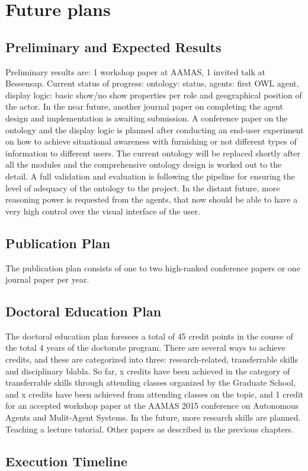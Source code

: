 \section{Future plans}
\subsection{Preliminary and Expected Results}

Preliminary results are: 1 workshop paper at AAMAS, 1 invited talk at Bessensap. 
Current status of progress: ontology: status, agents: first OWL agent, display logic: basic show/no show properties per role and geographical position of the actor. 
In the near future, another journal paper on completing the agent design and implementation is awaiting submission. A conference paper on the ontology and the display logic is planned after conducting an end-user experiment on how to achieve situational awareness with furnishing or not different types of information to different users. The current ontology will be replaced shortly after all the modules and the comprehensive ontology design is worked out to the detail. A full validation and evaluation is following the pipeline for ensuring the level of adequacy of the ontology to the project.
In the distant future, more reasoning power is requested from the agents, that now should be able to have a very high control over the visual interface of the user. 

\subsection{Publication Plan}

The publication plan consists of one to two high-ranked conference papers or one journal paper per year. 

\subsection{Doctoral Education Plan}
The doctoral education plan foresees a total of 45 credit points in the course of the total 4 years of the doctorate program. There are several ways to achieve credits, and these are categorized into three: research-related, transferrable skills and disciplinary blabla. So far, x credits have been achieved in the category of transferrable skills through attending classes organized by the Graduate School, and x credits have been achieved from attending classes on the topic, and 1 credit for an accepted workshop paper at the AAMAS 2015 conference on Autonomous Agents and Mulit-Agent Systems.
In the future, more research skills are planned.
Teaching a lecture tutorial.
Other papers as described in the previous chapters.

  
\subsection{Execution Timeline}  
  
  